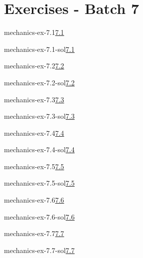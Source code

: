 \documentclass[preview]{standalone}
\begin{document}
\genpage

\section{Exercises - Batch 7}

\begin{snippetexercise}{mechanics-ex-7.1}{\underline{7.1}}
    \todo
\end{snippetexercise}

\begin{snippetsolution}{mechanics-ex-7.1-sol}{\underline{7.1}}
    \todo
\end{snippetsolution}

\begin{snippetexercise}{mechanics-ex-7.2}{\underline{7.2}}
    \todo
\end{snippetexercise}

\begin{snippetsolution}{mechanics-ex-7.2-sol}{\underline{7.2}}
    \todo
\end{snippetsolution}

\begin{snippetexercise}{mechanics-ex-7.3}{\underline{7.3}}
    \todo
\end{snippetexercise}

\begin{snippetsolution}{mechanics-ex-7.3-sol}{\underline{7.3}}
    \todo
\end{snippetsolution}

\begin{snippetexercise}{mechanics-ex-7.4}{\underline{7.4}}
    \todo
\end{snippetexercise}

\begin{snippetsolution}{mechanics-ex-7.4-sol}{\underline{7.4}}
    \todo
\end{snippetsolution}

\begin{snippetexercise}{mechanics-ex-7.5}{\underline{7.5}}
    \todo
\end{snippetexercise}

\begin{snippetsolution}{mechanics-ex-7.5-sol}{\underline{7.5}}
    \todo
\end{snippetsolution}

\begin{snippetexercise}{mechanics-ex-7.6}{\underline{7.6}}
    \todo
\end{snippetexercise}

\begin{snippetsolution}{mechanics-ex-7.6-sol}{\underline{7.6}}
    \todo
\end{snippetsolution}

\begin{snippetexercise}{mechanics-ex-7.7}{\underline{7.7}}
    \todo
\end{snippetexercise}

\begin{snippetsolution}{mechanics-ex-7.7-sol}{\underline{7.7}}
    \todo
\end{snippetsolution}
\end{document}
